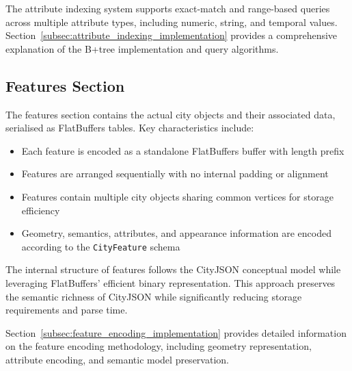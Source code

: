 The attribute indexing system supports exact-match and range-based queries across multiple attribute types, including numeric, string, and temporal values. Section~\ref{subsec:attribute_indexing_implementation} provides a comprehensive explanation of the B+tree implementation and query algorithms.

\subsection{Features Section}
\label{subsec:features_section}

The features section contains the actual city objects and their associated data, serialised as FlatBuffers tables. Key characteristics include:

\begin{itemize}
  \item Each feature is encoded as a standalone FlatBuffers buffer with length prefix
  \item Features are arranged sequentially with no internal padding or alignment
  \item Features contain multiple city objects sharing common vertices for storage efficiency
  \item Geometry, semantics, attributes, and appearance information are encoded according to the \texttt{CityFeature} schema
\end{itemize}

The internal structure of features follows the CityJSON conceptual model while leveraging FlatBuffers' efficient binary representation. This approach preserves the semantic richness of CityJSON while significantly reducing storage requirements and parse time.

Section~\ref{subsec:feature_encoding_implementation} provides detailed information on the feature encoding methodology, including geometry representation, attribute encoding, and semantic model preservation.
